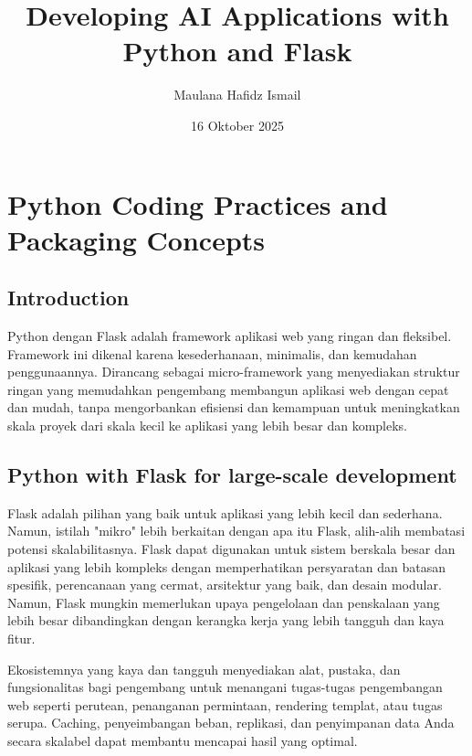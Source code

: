 \documentclass{article}
\title{Developing AI Applications with Python and Flask}
\date{16 Oktober 2025}
\author{Maulana Hafidz Ismail}
\begin{document}
\maketitle
\newpage

\tableofcontents
\newpage
{}

\section{Python Coding Practices and Packaging Concepts}
\subsection{Introduction}
Python dengan Flask adalah framework aplikasi web yang ringan dan fleksibel. Framework ini dikenal karena kesederhanaan, minimalis, dan kemudahan penggunaannya. Dirancang sebagai micro-framework yang menyediakan struktur ringan yang memudahkan pengembang membangun aplikasi web dengan cepat dan mudah, tanpa mengorbankan efisiensi dan kemampuan untuk meningkatkan skala proyek dari skala kecil ke aplikasi yang lebih besar dan kompleks.


\subsection{Python with Flask for large-scale development}
Flask adalah pilihan yang baik untuk aplikasi yang lebih kecil dan sederhana. Namun, istilah "mikro" lebih berkaitan dengan apa itu Flask, alih-alih membatasi potensi skalabilitasnya. Flask dapat digunakan untuk sistem berskala besar dan aplikasi yang lebih kompleks dengan memperhatikan persyaratan dan batasan spesifik, perencanaan yang cermat, arsitektur yang baik, dan desain modular. Namun, Flask mungkin memerlukan upaya pengelolaan dan penskalaan yang lebih besar dibandingkan dengan kerangka kerja yang lebih tangguh dan kaya fitur.

Ekosistemnya yang kaya dan tangguh menyediakan alat, pustaka, dan fungsionalitas bagi pengembang untuk menangani tugas-tugas pengembangan web seperti perutean, penanganan permintaan, rendering templat, atau tugas serupa. Caching, penyeimbangan beban, replikasi, dan penyimpanan data Anda secara skalabel dapat membantu mencapai hasil yang optimal.
\end{document}
